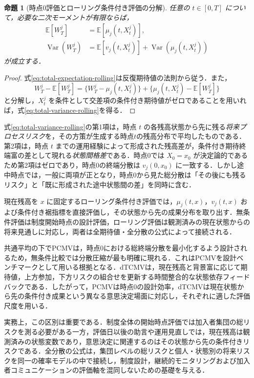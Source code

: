 \documentclass[10pt,a4paper]{article}
\theoremstyle{plain}
\newtheorem{proposition}{命題}
\theoremstyle{definition}
\newcommand{\E}{\mathbb{E}}
\DeclareMathOperator{\Var}{Var}
\begin{document}
\begin{proposition}[時点0評価とローリング条件付き評価の分解]
\label{prop:total-variance-rolling}
任意の $t\in[0,T]$ について，必要な二次モーメントが有限ならば，
\begin{align}
  \E[W_T^j]
  &=\E\!\left[\mu_j(t,X_t^j)\right],
  \label{eq:total-expectation-rolling}\\
  \Var(W_T^j)
  &=\E\!\left[v_j(t,X_t^j)\right]
    +\Var\!\left(\mu_j(t,X_t^j)\right)
  \label{eq:total-variance-rolling}
\end{align}
が成立する．
\end{proposition}

\begin{proof}
式\eqref{eq:total-expectation-rolling}は反復期待値の法則から従う．また，
\[
 W_T^j-\E[W_T^j]
 =\{W_T^j-\mu_j(t,X_t^j)\}
  +\{\mu_j(t,X_t^j)-\E[W_T^j]\}
\]
と分解し，$X_t^j$ を条件として交差項の条件付き期待値がゼロであることを用いれば，式\eqref{eq:total-variance-rolling}を得る．
\end{proof}

式\eqref{eq:total-variance-rolling}の第1項は，時点 $t$ の各残高状態から先に残る\emph{将来プロセスリスク}を，その方策が生成する時点$t$の残高分布で平均したものである．第2項は，時点 $t$ までの運用経験によって形成された残高差が，条件付き期待終端富の差として現れる\emph{状態間格差}である．時点0では $X_0=x_0$ が決定論的であるため第2項はゼロであり，時点0の終端分散は $v_j(0,x_0)$ に一致する．しかし途中時点では，一般に両項が正となり，時点0から見た総分散は「その後にも残るリスク」と「既に形成された途中状態間の差」を同時に含む．

現在残高を $x$ に固定するローリング条件付き評価では，$\mu_j(t,x)$，$v_j(t,x)$ および条件付き裾指標を直接評価し，その状態から先の成果分布を取り出す．無条件評価は制度開始時点の設計評価，ローリング評価は観測済みの現在状態からの将来見通しに対応し，両者は全期待値・全分散の公式によって接続される．

共通平均の下でPCMVは，時点0における総終端分散を最小化するよう設計されるため，無条件比較では分散圧縮が最も明確に現れる．これはPCMVを設計ベンチマークとして用いる根拠となる．dTCMVは，現在残高と背景富に応じて期待値，上方参加，下方リスクの組合せを更新する時間整合的な状態依存フィードバックである．したがって，PCMVは時点0の設計効率，dTCMVは現在状態から先の条件付き成果という異なる意思決定場面に対応し，それぞれに適した評価尺度を用いる．



実務上，この区別は重要である．制度全体の開始時点評価では加入者集団の総リスクを測る必要がある一方，評価日以後の助言や運用見直しでは，現在残高は観測済みの状態変数であり，意思決定に関連するのはその状態から先の条件付きリスクである．全分散の公式は，集団レベルの総リスクと個人・状態別の将来リスクを同一の確率モデルの中で接続し，制度設計，継続的モニタリングおよび加入者コミュニケーションの評価軸を混同しないための基礎を与える．
\end{document}
